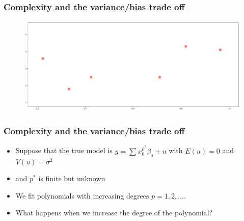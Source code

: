 \documentclass[
  shownotes,
  xcolor={svgnames},
  hyperref={colorlinks,citecolor=DarkBlue,linkcolor=DarkRed,urlcolor=DarkBlue}
  , aspectratio=169]{beamer}
\begin{document}

\begin{frame}[fragile]
\frametitle{Complexity and the variance/bias trade off}


        \begin{figure}[H] \centering
            \captionsetup{justification=centering}
              \includegraphics[scale=0.4]{figures/fig_1a.pdf}
 \end{figure}

\end{frame}

\begin{frame}[fragile]
\frametitle{Complexity and the variance/bias trade off}


\begin{itemize}

  \item Suppose that the true model is $y=\sum x_0^{p^*}\beta_s +u$ with $E(u)=0$ and $V(u)=\sigma^2$
  \medskip
  \item and $p^*$ is finite but unknown
  \medskip
  \item  We fit polynomials with increasing degrees $p=1,2,....$
  \medskip
  \item What happens when we increase the degree of the polynomial?
  \medskip


\end{itemize}

\end{frame}
\end{document}
